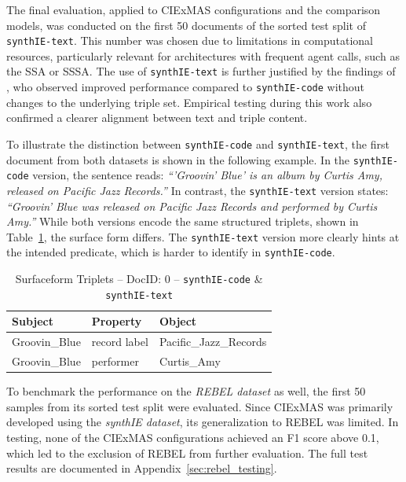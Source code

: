 \documentclass[a4paper,oneside,bibliography=totoc]{scrbook}
\begin{document}
The final evaluation, applied to CIExMAS configurations and the comparison models, was conducted on the first 50 documents of the sorted test split of \texttt{synthIE-text}. This number was chosen due to limitations in computational resources, particularly relevant for architectures with frequent agent calls, such as the \ac{SSA} or \ac{SSSA}. The use of \texttt{synthIE-text} is further justified by the findings of \citet{Josifoski2023}, who observed improved performance compared to \texttt{synthIE-code} without changes to the underlying triple set. Empirical testing during this work also confirmed a clearer alignment between text and triple content.

To illustrate the distinction between \texttt{synthIE-code} and \texttt{synthIE-text}, the first document from both datasets is shown in the following example. In the \texttt{synthIE-code} version, the sentence reads: \emph{\enquote{'Groovin' Blue' is an album by Curtis Amy, released on Pacific Jazz Records.}} In contrast, the \texttt{synthIE-text} version states: \emph{\enquote{Groovin' Blue was released on Pacific Jazz Records and performed by Curtis Amy.}} While both versions encode the same structured triplets, shown in Table~\ref{tab:triple-example}, the surface form differs. The \texttt{synthIE-text} version more clearly hints at the intended predicate, which is harder to identify in \texttt{synthIE-code}.

\begin{table}[h]
  \centering
  \begin{tabular}{l l l}
    \toprule
    \textbf{Subject} & \textbf{Property} & \textbf{Object}        \\
    \midrule
    Groovin\_Blue    & record label      & Pacific\_Jazz\_Records \\
    Groovin\_Blue    & performer         & Curtis\_Amy            \\
    \bottomrule
  \end{tabular}
  \caption{Surfaceform Triplets – DocID: 0 – \texttt{synthIE-code} \& \texttt{synthIE-text}}
  \label{tab:triple-example}
\end{table}

To benchmark the performance on the \textit{REBEL dataset} as well, the first 50 samples from its sorted test split were evaluated. Since CIExMAS was primarily developed using the \textit{synthIE dataset}, its generalization to REBEL was limited. In testing, none of the CIExMAS configurations achieved an F1 score above 0.1, which led to the exclusion of REBEL from further evaluation. The full test results are documented in Appendix~\ref{sec:rebel_testing}.
\end{document}
